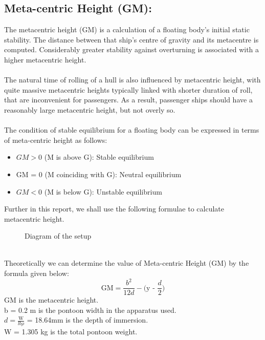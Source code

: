 \documentclass[12pt,a4paper]{article}
\begin{document}
\subsection{Meta-centric Height (GM):}
The metacentric height (GM) is a calculation of a floating body's initial static stability. The distance between that ship's centre of gravity and its metacentre is computed. Considerably greater stability against overturning is associated with a higher metacentric height.\\
\\The natural time of rolling of a hull is also influenced by metacentric height, with quite massive metacentric heights typically linked with shorter duration of roll, that are inconvenient for passengers. As a result, passenger ships should have a reasonably large metacentric height, but not overly so.\\
\\The condition of stable equilibrium for a floating body can be expressed in terms of meta-centric height as follows:
\begin{itemize}
\item $GM > 0$ (M is above G): Stable equilibrium
\item GM = 0 (M coinciding with G): Neutral equilibrium
\item $GM < 0$ (M is below G): Unstable equilibrium
\end{itemize}
Further in this report, we shall use the following formulae to calculate metacentric height.\\
\begin{figure}[!ht]
	\begin{center}
	\end{center}
	\caption{Diagram of the setup}
\end{figure}\\
Theoretically we can determine the value of Meta-centric Height (GM) by the formula given below:
\begin{equation}
    \text{GM} = \text{$\frac{\text{$b^2$}}{\text{$12d$}}$} - \text{(y - $\frac{\text{$d$}}{\text{$2$}}$)}
\end{equation}
GM is the metacentric height.\\
b = 0.2 m is the pontoon width in the apparatus used.\\
$d = \frac{\text{W}}{\text{$lb\rho$}}$ = 18.64mm is the depth of immersion.\\
W = 1.305 kg is the total pontoon weight.\\
\end{document}
